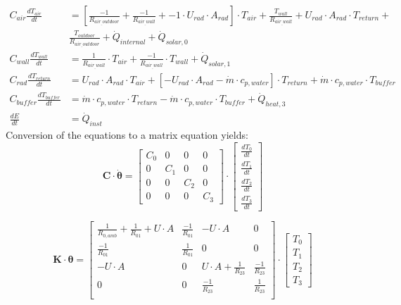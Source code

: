 \begin{equation}
	\begin{aligned}
		C_{air} \frac{dT_{air}}{dt} &= \left[ \frac{-1}{R_{air_{\_}outdoor}} + \frac{-1}{R_{air_{\_}wall}} +  -1 \cdot U_{rad} \cdot A_{rad} \right] \cdot T_{air} + \frac{T_{wall}}{R_{air_{\_}wall}} + U_{rad} \cdot A_{rad} \cdot T_{return} + \\
		 & \frac{T_{outdoor}}{R_{air_{\_}outdoor}}  + \dot{Q}_{internal} + \dot{Q}_{solar, 0} \\
		C_{wall} \frac{dT_{wall}}{dt} &= \frac{1}{R_{air_{\_}wall}} \cdot T_{air} + \frac{-1}{R_{air_{\_}wall}} \cdot T_{wall} + \dot{Q}_{solar, 1} \\
		C_{rad} \frac{dT_{return}}{dt} &=  U_{rad} \cdot A_{rad} \cdot T_{air} + \left[- U_{rad} \cdot A_{rad} -\dot{m} \cdot c_{p, water}\right] \cdot T_{return} + \dot{m} \cdot c_{p, water} \cdot T_{buffer}\\
		C_{buffer} \frac{dT_{buffer}}{dt} &= \dot{m} \cdot c_{p, water} \cdot T_{return} - \dot{m} \cdot c_{p, water} \cdot T_{buffer} + \dot{Q}_{heat, 3} \\
		\frac{dE}{dt} &= \dot{Q}_{inst}
	\end{aligned}
\end{equation}
Conversion of the equations to a matrix equation yields:
\begin{equation}
	\mathbf{C} \cdot \boldsymbol{\dot{\theta}} =
	\begin{bmatrix}
		C_{0} & 0 & 0 & 0\\
		0 &  C_{1} & 0 & 0 \\
		0 & 0 & C_{2} & 0\\
		0 & 0 & 0 & C_{3}
	\end{bmatrix}
	\cdot
	\begin{bmatrix}
		\frac{dT_{0}}{dt} \\
		\frac{dT_{1}}{dt} \\
		\frac{dT_{2}}{dt} \\
		\frac{dT_{3}}{dt} 
	\end{bmatrix}
\end{equation}

\begin{equation}
	\mathbf{K} \cdot \boldsymbol{\theta} =
	\begin{bmatrix}
		\frac{1}{R_{0, amb}} + \frac{1}{R_{01}} + U \cdot A & \frac{-1}{R_{01}} & -U \cdot A & 0 \\
		\frac{-1}{R_{01}} &  \frac{1}{R_{01}}  & 0 & 0 \\
		-U \cdot A & 0 & U \cdot A + \frac{1}{R_{23}}  & \frac{-1}{R_{23}}\\
		0 & 0 & \frac{-1}{R_{23}} &  \frac{1}{R_{23}} \\
	\end{bmatrix}
	\cdot
	\begin{bmatrix}
		T_{0} \\
		T_{1} \\
		T_{2} \\
		T_{3}
	\end{bmatrix}
\end{equation}

